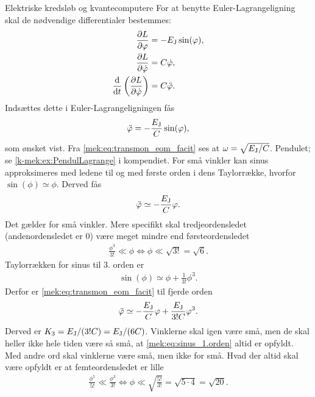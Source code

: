 \documentclass[crop=false, class=memoir]{standalone}
\begin{document}
\begin{opgave}[3]{Elektriske kredsløb og kvantecomputere}
%
\opg For at benytte Euler-Lagrangeligning skal de nødvendige differentialer bestemmes:
%
\begin{align*}
    \pdv{L}{\phi} &= -E_\textup{J}\sin(\phi), \\
    \pdv{L}{\dot{\phi}} &= C\dot{\phi}, \\
    \el{\phi} &= C\ddot{\phi}.
\end{align*}
%
Indsættes dette i Euler-Lagrangeligningen fås
%
\begin{align} \label{mek:eq:transmon_eom_facit}
    \ddot{\phi} = - \frac{E_\textup{J}}{C}\sin(\phi),
\end{align}
%
som ønsket vist.
\opg Fra \cref{mek:eq:transmon_eom_facit} ses at $\omega = \sqrt{E_\textup{J}/C}$.
%
\opg Pendulet; se \cref{k-mek:ex:PendulLagrange} i kompendiet.
%
\opg For små vinkler kan sinus approksimeres med ledene til og med første orden i dens Taylorrække, hvorfor $\sin(\phi) \simeq \phi$. Derved fås
%
\begin{align*}
    \ddot{\phi} \simeq - \frac{E_\textup{J}}{C} \phi.
\end{align*}
%
\opg Det gælder for små vinkler. Mere specifikt skal tredjeordensledet (andenordensledet er 0) være meget mindre end førsteordensledet
%
\begin{align} \label{mek:eq:sinus_1.orden}
    \frac{\phi^3}{3!} \ll \phi \iff \phi \ll \sqrt{3!} = \sqrt{6}.
\end{align}
%
\opg Taylorrækken for sinus til 3. orden er
%
\begin{align*}
    \sin(\phi) \simeq \phi + \frac{1}{3!}\phi^3.
\end{align*}
%
Derfor er \cref{mek:eq:transmon_eom_facit} til fjerde orden
%
\begin{align}
    \ddot{\phi} \simeq - \frac{E_\textup{J}}{C} \phi + \frac{E_\textup{J}}{3!C} \phi^3.
\end{align}
%
Derved er $K_3 = E_\textup{J}/(3!C) = E_\textup{J}/(6C)$.
%
\opg Vinklerne skal igen være små, men de skal heller ikke hele tiden være så små, at \cref{mek:eq:sinus_1.orden} altid er opfyldt. Med andre ord skal vinklerne være små, men ikke for små. Hvad der altid skal være opfyldt er at femteordensledet er lille
%
\begin{align} \label{mek:eq:sinus_3.orden}
    \frac{\phi^5}{5!} \ll \frac{\phi^3}{3!} \iff \phi \ll \sqrt{\frac{5!}{3!}} = \sqrt{5\cdot4} = \sqrt{20}.
\end{align}
%
\end{opgave}
\end{document}
